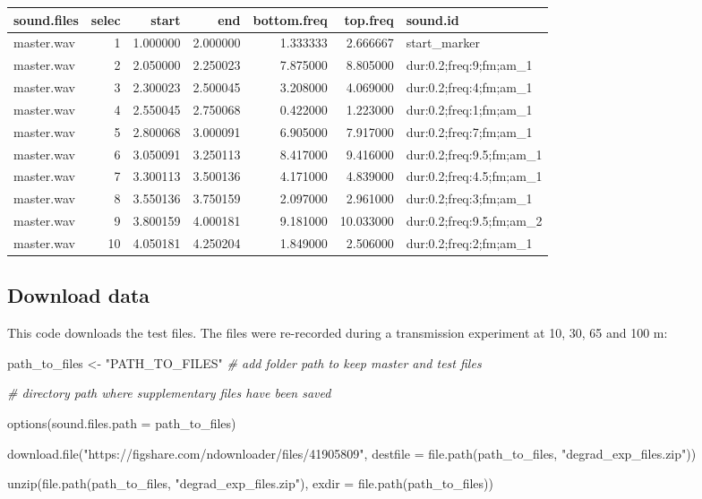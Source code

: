\documentclass[
  letterpaper,
  DIV=11,
  numbers=noendperiod]{scrartcl}
\newenvironment{Shaded}{\begin{snugshade}}{\end{snugshade}}
\newcommand{\AttributeTok}[1]{\textcolor[rgb]{0.49,0.56,0.16}{#1}}
\newcommand{\CommentTok}[1]{\textcolor[rgb]{0.38,0.63,0.69}{\textit{#1}}}
\newcommand{\FunctionTok}[1]{\textcolor[rgb]{0.02,0.16,0.49}{#1}}
\newcommand{\NormalTok}[1]{\textcolor[rgb]{0.00,0.44,0.13}{#1}}
\newcommand{\OtherTok}[1]{\textcolor[rgb]{0.00,0.44,0.13}{#1}}
\newcommand{\StringTok}[1]{\textcolor[rgb]{0.25,0.44,0.63}{#1}}
\begin{document}
\begin{landscape}
\begin{longtable*}[t]{lrrrrrl}
\toprule
sound.files & selec & start & end & bottom.freq & top.freq & sound.id\\
\midrule
master.wav & 1 & 1.000000 & 2.000000 & 1.333333 & 2.666667 & start\_marker\\
master.wav & 2 & 2.050000 & 2.250023 & 7.875000 & 8.805000 & dur:0.2;freq:9;fm;am\_1\\
master.wav & 3 & 2.300023 & 2.500045 & 3.208000 & 4.069000 & dur:0.2;freq:4;fm;am\_1\\
master.wav & 4 & 2.550045 & 2.750068 & 0.422000 & 1.223000 & dur:0.2;freq:1;fm;am\_1\\
master.wav & 5 & 2.800068 & 3.000091 & 6.905000 & 7.917000 & dur:0.2;freq:7;fm;am\_1\\
\addlinespace
master.wav & 6 & 3.050091 & 3.250113 & 8.417000 & 9.416000 & dur:0.2;freq:9.5;fm;am\_1\\
master.wav & 7 & 3.300113 & 3.500136 & 4.171000 & 4.839000 & dur:0.2;freq:4.5;fm;am\_1\\
master.wav & 8 & 3.550136 & 3.750159 & 2.097000 & 2.961000 & dur:0.2;freq:3;fm;am\_1\\
master.wav & 9 & 3.800159 & 4.000181 & 9.181000 & 10.033000 & dur:0.2;freq:9.5;fm;am\_2\\
master.wav & 10 & 4.050181 & 4.250204 & 1.849000 & 2.506000 & dur:0.2;freq:2;fm;am\_1\\
\bottomrule
\end{longtable*}
\end{landscape}

\hypertarget{download-data}{%
\subsection{Download data}\label{download-data}}

This code downloads the test files. The files were re-recorded during a
transmission experiment at 10, 30, 65 and 100 m:

\begin{Shaded}
\begin{Highlighting}[numbers=left,,]
\NormalTok{path\_to\_files }\OtherTok{\textless{}{-}} \StringTok{"PATH\_TO\_FILES"}  \CommentTok{\# add folder path to keep master and test files}

\CommentTok{\# directory path where supplementary files have been saved}

\FunctionTok{options}\NormalTok{(}\AttributeTok{sound.files.path =}\NormalTok{ path\_to\_files)}

\FunctionTok{download.file}\NormalTok{(}\StringTok{"https://figshare.com/ndownloader/files/41905809"}\NormalTok{, }\AttributeTok{destfile =} \FunctionTok{file.path}\NormalTok{(path\_to\_files,}
    \StringTok{"degrad\_exp\_files.zip"}\NormalTok{))}

\FunctionTok{unzip}\NormalTok{(}\FunctionTok{file.path}\NormalTok{(path\_to\_files, }\StringTok{"degrad\_exp\_files.zip"}\NormalTok{), }\AttributeTok{exdir =} \FunctionTok{file.path}\NormalTok{(path\_to\_files))}
\end{Highlighting}
\end{Shaded}
\end{document}

